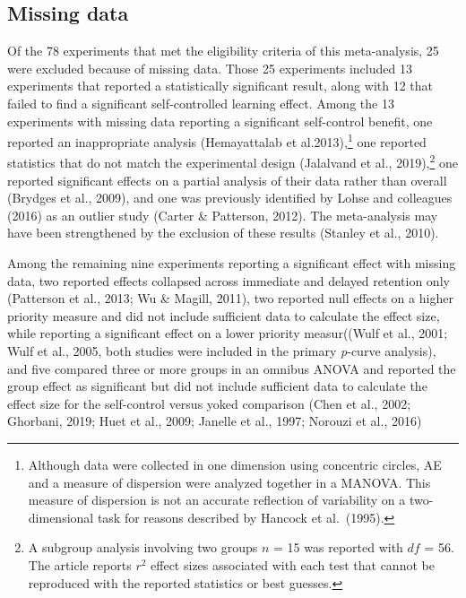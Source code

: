 \documentclass[
  english,
  man,floatsintext]{apa7}
\begin{document}
\clearpage
\makeatletter
\efloat@restorefloats
\makeatother


\begin{appendix}
\hypertarget{missing-data}{%
\section{Missing data}\label{missing-data}}

Of the 78 experiments that met the eligibility criteria of this
meta-analysis, 25 were excluded because of missing data. Those 25
experiments included 13 experiments that reported a statistically
significant result, along with 12 that failed to find a significant
self-controlled learning effect. Among the 13 experiments with missing
data reporting a significant self-control benefit, one reported an
inappropriate analysis (Hemayattalab et al.2013),\footnote{Although data
  were collected in one dimension using concentric circles, AE and a
  measure of dispersion were analyzed together in a MANOVA. This measure
  of dispersion is not an accurate reflection of variability on a
  two-dimensional task for reasons described by Hancock et al.~(1995).}
one reported statistics that do not match the experimental design
(Jalalvand et al., 2019),\footnote{A subgroup analysis involving two
  groups \(n\) = 15 was reported with \(df\) = 56. The article reports
  \(r^2\) effect sizes associated with each test that cannot be
  reproduced with the reported statistics or best guesses.} one reported
significant effects on a partial analysis of their data rather than
overall (Brydges et al., 2009), and one was previously identified by
Lohse and colleagues (2016) as an outlier study (Carter \& Patterson,
2012). The meta-analysis may have been strengthened by the exclusion of
these results (Stanley et al., 2010).

Among the remaining nine experiments reporting a significant effect with
missing data, two reported effects collapsed across immediate and
delayed retention only (Patterson et al., 2013; Wu \& Magill, 2011), two
reported null effects on a higher priority measure and did not include
sufficient data to calculate the effect size, while reporting a
significant effect on a lower priority measur((Wulf et al., 2001; Wulf
et al., 2005, both studies were included in the primary \emph{p}-curve
analysis), and five compared three or more groups in an omnibus ANOVA
and reported the group effect as significant but did not include
sufficient data to calculate the effect size for the self-control versus
yoked comparison (Chen et al., 2002; Ghorbani, 2019; Huet et al., 2009;
Janelle et al., 1997; Norouzi et al., 2016)
\end{appendix}
\end{document}
